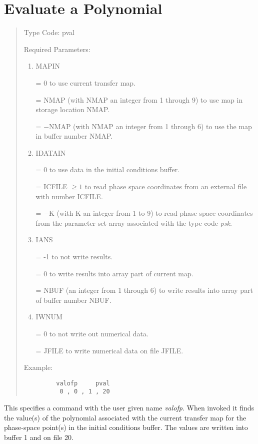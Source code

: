 \section{Evaluate a Polynomial} 
\begin{quotation}
\noindent Type Code:  pval
\vspace{5mm}

\noindent Required Parameters:
\begin{enumerate}
      \item  MAPIN

             = 0 to use current transfer map.

             = NMAP (with NMAP an integer from 1 through 9) to use map in
               storage \hspace*{1em}location NMAP.

             = $-$NMAP (with NMAP an integer from 1 through 6) to use the map in
               \hspace*{1em}buffer number NMAP.


      \item  IDATAIN

             = 0 to use data in the initial conditions buffer.

             = ICFILE $\geq 1$ to read phase space coordinates from an external
               file with \hspace*{1em}number ICFILE.

             = $-$K (with K an integer from 1 to 9) to read phase space
               coordinates from \hspace*{1em}the parameter set array associated with the
               type code {\em psk}.

        \item  IANS

                     = -1 to not write results.

             = 0 to write results into array part of current map.

             = NBUF (an integer from 1 through 6) to write results into array part of \hspace*{1em}buffer number NBUF.

      \item  IWNUM

             = 0 to not write out numerical data.

             = JFILE to write numerical data on file JFILE.
\end{enumerate}

\vspace{5mm}
\noindent Example:
\begin{verbatim}
         valofp     pval
          0 , 0 , 1 , 20
\end{verbatim}
\end{quotation}
This specifies a command with the user given name {\em valofp}.  When invoked it finds the value(s) of the polynomial associated with the current transfer map for the phase-space point(s) in the initial conditions buffer.  The values are written into buffer 1 and on file 20.

